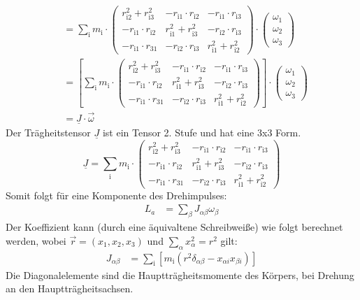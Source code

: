 \begin{align}
    &=\sum_\text{i}m_\text{i}\cdot\begin{pmatrix}r^2_{\text{i}2}+r^2_{\text{i}3}&-r_{\text{i}1}\cdot r_{\text{i}2}&-r_{\text{i}1}\cdot r_{\text{i}3}\\-r_{\text{i}1}\cdot r_{\text{i}2}&r^2_{\text{i}1}+r^2_{\text{i}3}&-r_{\text{i}2}\cdot r_{\text{i}3}\\-r_{\text{i}1}\cdot r_{\text{3}1}&-r_{\text{i}2}\cdot r_{\text{i}3}&r^2_{\text{i}1}+r^2_{\text{i}2}\end{pmatrix}\cdot\begin{pmatrix}\omega_1\\\omega_2\\\omega_3\end{pmatrix}\\
    &=\left[\sum_\text{i}m_\text{i}\cdot\begin{pmatrix}r^2_{\text{i}2}+r^2_{\text{i}3}&-r_{\text{i}1}\cdot r_{\text{i}2}&-r_{\text{i}1}\cdot r_{\text{i}3}\\-r_{\text{i}1}\cdot r_{\text{i}2}&r^2_{\text{i}1}+r^2_{\text{i}3}&-r_{\text{i}2}\cdot r_{\text{i}3}\\-r_{\text{i}1}\cdot r_{\text{3}1}&-r_{\text{i}2}\cdot r_{\text{i}3}&r^2_{\text{i}1}+r^2_{\text{i}2}\end{pmatrix}\right]\cdot\begin{pmatrix}\omega_1\\\omega_2\\\omega_3\end{pmatrix}\\
    &=\underline{J} \cdot \vec{\omega}
\end{align}
Der Trägheitstensor $\underline{J}$ ist ein Tensor 2. Stufe und hat eine 3x3 Form.
\begin{equation}
   \underline{J}=\sum_\text{i}m_\text{i}\cdot\begin{pmatrix}r^2_{\text{i}2}+r^2_{\text{i}3}&-r_{\text{i}1}\cdot r_{\text{i}2}&-r_{\text{i}1}\cdot r_{\text{i}3}\\-r_{\text{i}1}\cdot r_{\text{i}2}&r^2_{\text{i}1}+r^2_{\text{i}3}&-r_{\text{i}2}\cdot r_{\text{i}3}\\-r_{\text{i}1}\cdot r_{\text{3}1}&-r_{\text{i}2}\cdot r_{\text{i}3}&r^2_{\text{i}1}+r^2_{\text{i}2}\end{pmatrix}
\end{equation}
Somit folgt für eine Komponente des Drehimpulses:
\begin{align}
    L_a&=\sum_\beta J_{\alpha\beta}\omega_\beta
\end{align}
Der Koeffizient kann (durch eine äquivaltene Schreibweiße) wie folgt berechnet werden, wobei \(\vec{r}=(x_1,x_2,x_3)\) und \(\sum_\alpha x_\alpha^2=r^2\) gilt:
\begin{align}
    J_{\alpha\beta}&=\sum_\text{i}\left[m_\text{i}\left(r^2\delta_{\alpha\beta}-x_{\alpha i}x_{\beta i}\right)\right]
\end{align}
Die Diagonalelemente sind die Hauptträgheitsmomente des Körpers, bei Drehung an den Hauptträgheitsachsen.
